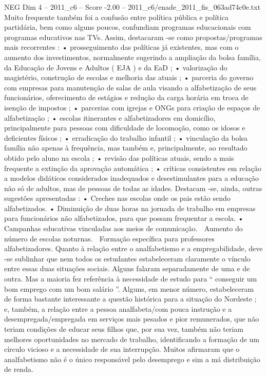 \begin{textsample}{NEG Dim 4 – 2011\_c6 – Score -2.00 – 2011\_c6/enade\_2011\_fis\_063ad74c0e.txt}
Muito frequente também foi a confusão entre política pública e política partidária, bem como alguns poucos, confundiam programas educacionais com programas educativos nas TVs.
Assim, destacaram -se como propostas/programas mais recorrentes : • prosseguimento das políticas já existentes, mas com o aumento dos investimentos, normalmente sugerindo a ampliação da bolsa família, da Educação de Jovens e Adultos ( EJA ) e da EaD ; • valorização do magistério, construção de escolas e melhoria das atuais ; • parceria do governo com empresas para manutenção de salas de aula visando a alfabetização de seus funcionários, oferecimento de estágios e redução da carga horária em troca de isenção de impostos ; • parcerias com igrejas e ONGs para criação de espaços de alfabetização ; • escolas itinerantes e alfabetizadores em domicílio, principalmente para pessoas com dificuldade de locomoção, como os idosos e deficientes físicos ; • erradicação do trabalho infantil ; • vinculação da bolsa família não apenas à frequência, mas também e, principalmente, ao resultado obtido pelo aluno na escola ; • revisão das políticas atuais, sendo a mais frequente a extinção da aprovação automática ; • críticas consistentes em relação a modelos didáticos considerados inadequados e desestimulantes para a educação não só de adultos, mas de pessoas de todas as idades.
Destacam -se, ainda, outras sugestões apresentadas : • Creches nas escolas onde os pais estão sendo alfabetizados. • Diminuição de duas horas na jornada de trabalho em empresas para funcionários não alfabetizados, para que possam frequentar a escola. • Campanhas educativas vinculadas aos meios de comunicação.  Aumento do número de escolas noturnas.  Formação específica para professores alfabetizadores.
Quanto à relação entre o analfabetismo e a empregabilidade, deve -se sublinhar que nem todos os estudantes estabeleceram claramente o vínculo entre essas duas situações sociais.
Alguns falaram separadamente de uma e de outra.
Mas a maioria fez referência à necessidade de estudo para “ conseguir um bom emprego com um bom salário ”.
Alguns, em menor número, estabeleceram de forma bastante interessante a questão histórica para a situação do Nordeste ; e, também, a relação entre a pessoa analfabeta/com pouca instrução e a desempregada/empregada em serviços mais pesados e pior remunerados, que não teriam condições de educar seus filhos que, por sua vez, também não teriam melhores oportunidades no mercado de trabalho, identificando a formação de um círculo vicioso e a necessidade de sua interrupção.
Muitos afirmaram que o analfabetismo não é o único responsável pelo desemprego e sim a má distribuição de renda.

\end{textsample}

